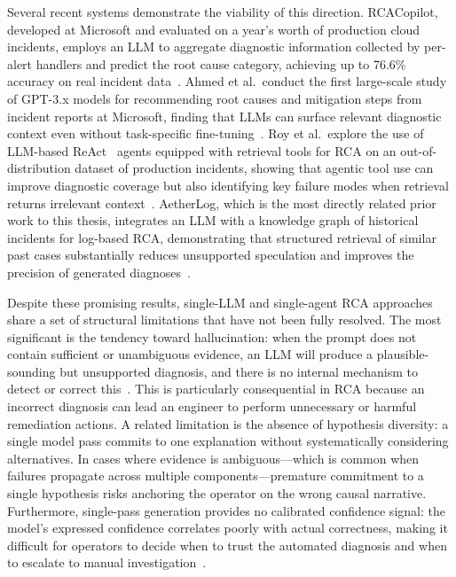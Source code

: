 Several recent systems demonstrate the viability of this direction. RCACopilot, developed at
Microsoft and evaluated on a year's worth of production cloud incidents, employs an LLM to
aggregate diagnostic information collected by per-alert handlers and predict the root cause
category, achieving up to 76.6\% accuracy on real incident
data~\cite{chen2024rcacopilot}. Ahmed et al.\ conduct the first large-scale study of GPT-3.x
models for recommending root causes and mitigation steps from incident reports at Microsoft,
finding that LLMs can surface relevant diagnostic context even without task-specific
fine-tuning~\cite{ahmed2023rcarecommend}. Roy et al.\ explore the use of LLM-based
ReAct~\cite{yao2023reactsynergizingreasoningacting} agents equipped with retrieval tools for RCA
on an out-of-distribution dataset of production incidents, showing that agentic tool use can
improve diagnostic coverage but also identifying key failure modes when retrieval returns
irrelevant context~\cite{roy2024llmagentRCA}. AetherLog, which is the most directly related
prior work to this thesis, integrates an LLM with a knowledge graph of historical incidents for
log-based RCA, demonstrating that structured retrieval of similar past cases substantially
reduces unsupported speculation and improves the precision of generated
diagnoses~\cite{cui2025aetherlog}.

Despite these promising results, single-LLM and single-agent RCA approaches share a set of
structural limitations that have not been fully resolved. The most significant is the tendency
toward hallucination: when the prompt does not contain sufficient or unambiguous evidence, an LLM
will produce a plausible-sounding but unsupported diagnosis, and there is no internal mechanism
to detect or correct this~\cite{du2023improvingfactualityreasoninglanguage}. This is particularly
consequential in RCA because an incorrect diagnosis can lead an engineer to perform unnecessary
or harmful remediation actions. A related limitation is the absence of hypothesis diversity: a
single model pass commits to one explanation without systematically considering alternatives. In
cases where evidence is ambiguous---which is common when failures propagate across multiple
components---premature commitment to a single hypothesis risks anchoring the operator on the
wrong causal narrative. Furthermore, single-pass generation provides no calibrated confidence
signal: the model's expressed confidence correlates poorly with actual correctness, making it
difficult for operators to decide when to trust the automated diagnosis and when to escalate
to manual investigation~\cite{chen2024rcacopilot,roy2024llmagentRCA}.

